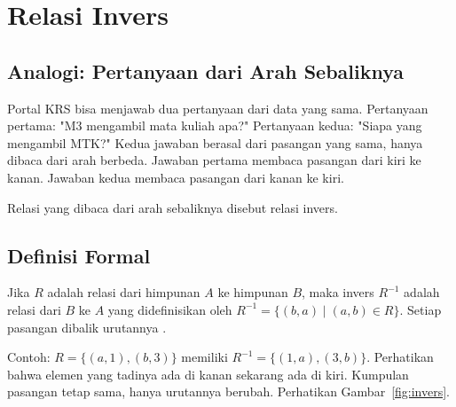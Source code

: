 \documentclass[11pt,a4paper]{article}
\begin{document}
\section{Relasi Invers}

\subsection{Analogi: Pertanyaan dari Arah Sebaliknya}

Portal KRS bisa menjawab dua pertanyaan dari data yang sama. Pertanyaan pertama: "M3 mengambil mata kuliah apa?" Pertanyaan kedua: "Siapa yang mengambil MTK?" Kedua jawaban berasal dari pasangan yang sama, hanya dibaca dari arah berbeda. Jawaban pertama membaca pasangan dari kiri ke kanan. Jawaban kedua membaca pasangan dari kanan ke kiri.

Relasi yang dibaca dari arah sebaliknya disebut relasi invers.

\subsection{Definisi Formal}

Jika $R$ adalah relasi dari himpunan $A$ ke himpunan $B$, maka invers $R^{-1}$ adalah relasi dari $B$ ke $A$ yang didefinisikan oleh $R^{-1}=\{(b,a) \mid (a,b) \in R\}$. Setiap pasangan dibalik urutannya \cite{rosen}.

Contoh: $R=\{(a,1),(b,3)\}$ memiliki $R^{-1}=\{(1,a),(3,b)\}$. Perhatikan bahwa elemen yang tadinya ada di kanan sekarang ada di kiri. Kumpulan pasangan tetap sama, hanya urutannya berubah. Perhatikan Gambar~\ref{fig:invers}.
\end{document}
